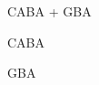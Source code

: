 \documentclass[a4paper, 10pt]{article}
\begin{document}
				\begin{figure}
    				\centering
    				\caption{CABA + GBA}
				\end{figure}
				\begin{figure}
    				\centering
    				\caption{CABA}
				\end{figure}
				\begin{figure}
    				\centering
    				\caption{GBA}
				\end{figure}
				\FloatBarrier
				
\end{document}
